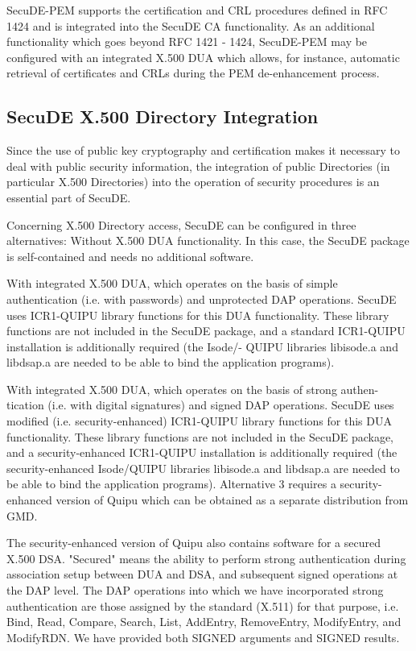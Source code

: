 SecuDE-PEM supports the certification and CRL procedures defined in 
RFC 1424 and is integrated into the SecuDE CA functionality. As an additional 
functionality which goes beyond RFC 1421 - 1424, SecuDE-PEM may be 
configured with an integrated X.500 DUA which allows, for instance, 
automatic retrieval of certificates and CRLs during the PEM de-enhancement process.


\subsection{SecuDE X.500 Directory Integration}
\label{x500}
Since the use of public key cryptography and certification makes it necessary
to deal with public security information, the integration of public Directories 
(in particular X.500 Directories) into the operation of security procedures
is an essential part of SecuDE.

Concerning X.500 Directory access, SecuDE can be configured in three 
alternatives:
\be
\m Without X.500 DUA functionality. In this case, the SecuDE package
     is self-contained and needs no additional software.

\m With integrated X.500 DUA, which operates on the basis of simple
     authentication (i.e. with passwords) and unprotected DAP operations.
     SecuDE uses ICR1-QUIPU library functions for this DUA functionality.
     These library functions are not included in the SecuDE package, and
     a standard ICR1-QUIPU installation is additionally required (the Isode/-
     QUIPU libraries libisode.a and libdsap.a are needed to be able to bind 
     the application programs).

\m With integrated X.500 DUA, which operates on the basis of strong authen-
     tication (i.e. with digital signatures) and signed DAP operations.
     SecuDE uses modified (i.e. security-enhanced) ICR1-QUIPU library 
     functions for this DUA functionality. These library functions are not 
     included in the SecuDE package, and a security-enhanced ICR1-QUIPU 
     installation is additionally required (the security-enhanced Isode/QUIPU 
     libraries libisode.a and libdsap.a are needed to be able to bind the 
     application programs).
\ee
Alternative 3 requires a security-enhanced version of Quipu which can be
obtained as a separate distribution from GMD. 

The security-enhanced version of Quipu also contains software for a secured X.500 
DSA. "Secured" means the ability to perform strong authentication during
association setup between DUA and DSA, and subsequent signed operations at the 
DAP level. The DAP operations into which we have incorporated strong authentication 
are those assigned by the standard (X.511) for that purpose, i.e. Bind, Read, 
Compare, Search, List, AddEntry, RemoveEntry, ModifyEntry, and ModifyRDN. We have 
provided both SIGNED arguments and SIGNED results.


